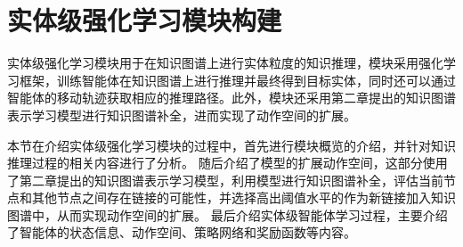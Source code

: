 \documentclass[algorithmlist, AutoFakeBold, AutoFakeSlant, figurelist, tablelist, nomlist, engineering]{seuthesix}
\begin{document}
\section{实体级强化学习模块构建}
实体级强化学习模块用于在知识图谱上进行实体粒度的知识推理，模块采用强化学习框架，训练智能体在知识图谱上进行推理并最终得到目标实体，同时还可以通过智能体的移动轨迹获取相应的推理路径。此外，模块还采用第二章提出的知识图谱表示学习模型进行知识图谱补全，进而实现了动作空间的扩展。

本节在介绍实体级强化学习模块的过程中，首先进行模块概览的介绍，并针对知识推理过程的相关内容进行了分析。
随后介绍了模型的扩展动作空间，这部分使用了第二章提出的知识图谱表示学习模型，利用模型进行知识图谱补全，评估当前节点和其他节点之间存在链接的可能性，并选择高出阈值水平的作为新链接加入知识图谱中，从而实现动作空间的扩展。
最后介绍实体级智能体学习过程，主要介绍了智能体的状态信息、动作空间、策略网络和奖励函数等内容。
\end{document}
